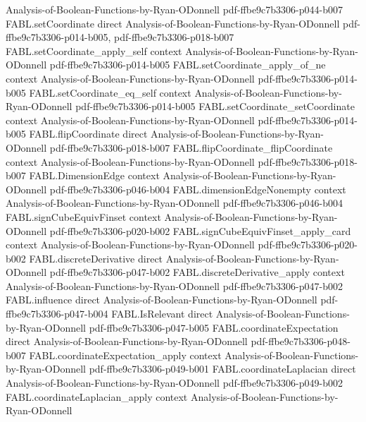 \begin{theorem}
  {Analysis-of-Boolean-Functions-by-Ryan-ODonnell}
  {pdf-ffbe9c7b3306-p044-b007}
\proofstep
  {FABL.setCoordinate}
  {direct}
  {Analysis-of-Boolean-Functions-by-Ryan-ODonnell}
  {pdf-ffbe9c7b3306-p014-b005,
    pdf-ffbe9c7b3306-p018-b007}
\proofstep
  {FABL.setCoordinate_apply_self}
  {context}
  {Analysis-of-Boolean-Functions-by-Ryan-ODonnell}
  {pdf-ffbe9c7b3306-p014-b005}
\proofstep
  {FABL.setCoordinate_apply_of_ne}
  {context}
  {Analysis-of-Boolean-Functions-by-Ryan-ODonnell}
  {pdf-ffbe9c7b3306-p014-b005}
\proofstep
  {FABL.setCoordinate_eq_self}
  {context}
  {Analysis-of-Boolean-Functions-by-Ryan-ODonnell}
  {pdf-ffbe9c7b3306-p014-b005}
\proofstep
  {FABL.setCoordinate_setCoordinate}
  {context}
  {Analysis-of-Boolean-Functions-by-Ryan-ODonnell}
  {pdf-ffbe9c7b3306-p014-b005}
\proofstep
  {FABL.flipCoordinate}
  {direct}
  {Analysis-of-Boolean-Functions-by-Ryan-ODonnell}
  {pdf-ffbe9c7b3306-p018-b007}
\proofstep
  {FABL.flipCoordinate_flipCoordinate}
  {context}
  {Analysis-of-Boolean-Functions-by-Ryan-ODonnell}
  {pdf-ffbe9c7b3306-p018-b007}
\proofstep
  {FABL.DimensionEdge}
  {context}
  {Analysis-of-Boolean-Functions-by-Ryan-ODonnell}
  {pdf-ffbe9c7b3306-p046-b004}
\proofstep
  {FABL.dimensionEdgeNonempty}
  {context}
  {Analysis-of-Boolean-Functions-by-Ryan-ODonnell}
  {pdf-ffbe9c7b3306-p046-b004}
\proofstep
  {FABL.signCubeEquivFinset}
  {context}
  {Analysis-of-Boolean-Functions-by-Ryan-ODonnell}
  {pdf-ffbe9c7b3306-p020-b002}
\proofstep
  {FABL.signCubeEquivFinset_apply_card}
  {context}
  {Analysis-of-Boolean-Functions-by-Ryan-ODonnell}
  {pdf-ffbe9c7b3306-p020-b002}
\proofstep
  {FABL.discreteDerivative}
  {direct}
  {Analysis-of-Boolean-Functions-by-Ryan-ODonnell}
  {pdf-ffbe9c7b3306-p047-b002}
\proofstep
  {FABL.discreteDerivative_apply}
  {context}
  {Analysis-of-Boolean-Functions-by-Ryan-ODonnell}
  {pdf-ffbe9c7b3306-p047-b002}
\proofstep
  {FABL.influence}
  {direct}
  {Analysis-of-Boolean-Functions-by-Ryan-ODonnell}
  {pdf-ffbe9c7b3306-p047-b004}
\proofstep
  {FABL.IsRelevant}
  {direct}
  {Analysis-of-Boolean-Functions-by-Ryan-ODonnell}
  {pdf-ffbe9c7b3306-p047-b005}
\proofstep
  {FABL.coordinateExpectation}
  {direct}
  {Analysis-of-Boolean-Functions-by-Ryan-ODonnell}
  {pdf-ffbe9c7b3306-p048-b007}
\proofstep
  {FABL.coordinateExpectation_apply}
  {context}
  {Analysis-of-Boolean-Functions-by-Ryan-ODonnell}
  {pdf-ffbe9c7b3306-p049-b001}
\proofstep
  {FABL.coordinateLaplacian}
  {direct}
  {Analysis-of-Boolean-Functions-by-Ryan-ODonnell}
  {pdf-ffbe9c7b3306-p049-b002}
\proofstep
  {FABL.coordinateLaplacian_apply}
  {context}
  {Analysis-of-Boolean-Functions-by-Ryan-ODonnell}

\end{theorem}
